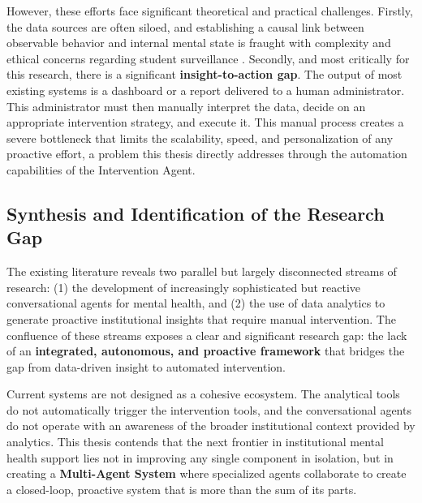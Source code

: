 However, these efforts face significant theoretical and practical challenges. Firstly, the data sources are often siloed, and establishing a causal link between observable behavior and internal mental state is fraught with complexity and ethical concerns regarding student surveillance \cite{FIND_CITATION_PLEASE}. Secondly, and most critically for this research, there is a significant \textbf{insight-to-action gap}. The output of most existing systems is a dashboard or a report delivered to a human administrator. This administrator must then manually interpret the data, decide on an appropriate intervention strategy, and execute it. This manual process creates a severe bottleneck that limits the scalability, speed, and personalization of any proactive effort, a problem this thesis directly addresses through the automation capabilities of the Intervention Agent.

\subsection{Synthesis and Identification of the Research Gap}

The existing literature reveals two parallel but largely disconnected streams of research: (1) the development of increasingly sophisticated but reactive conversational agents for mental health, and (2) the use of data analytics to generate proactive institutional insights that require manual intervention. The confluence of these streams exposes a clear and significant research gap: the lack of an \textbf{integrated, autonomous, and proactive framework} that bridges the gap from data-driven insight to automated intervention.

Current systems are not designed as a cohesive ecosystem. The analytical tools do not automatically trigger the intervention tools, and the conversational agents do not operate with an awareness of the broader institutional context provided by analytics. This thesis contends that the next frontier in institutional mental health support lies not in improving any single component in isolation, but in creating a \textbf{Multi-Agent System} where specialized agents collaborate to create a closed-loop, proactive system that is more than the sum of its parts.

